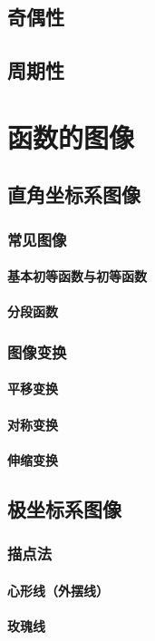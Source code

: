 \documentclass[UTF8, 12pt]{ctexart}
\begin{document}
\subsection{奇偶性}
\subsection{周期性}
\section{函数的图像}
\subsection{直角坐标系图像}
\subsubsection{常见图像}
\paragraph{基本初等函数与初等函数}
\paragraph{分段函数}
\subsubsection{图像变换}
\paragraph{平移变换}
\paragraph{对称变换}
\paragraph{伸缩变换}
\subsection{极坐标系图像}
\subsubsection{描点法}
\paragraph{心形线（外摆线）}
\paragraph{玫瑰线}
\end{document}
